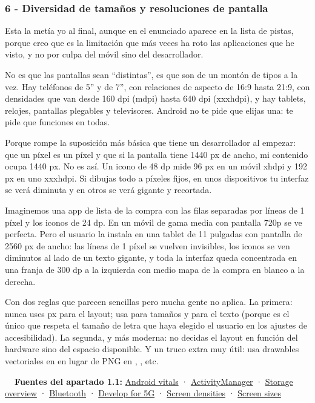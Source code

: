\subsubsection*{6 - Diversidad de tamaños y resoluciones de pantalla}

Esta la metía yo al final, aunque en el enunciado aparece en la lista de pistas, porque creo que es la limitación que más veces ha roto las aplicaciones que he visto, y no por culpa del móvil sino del desarrollador.

No es que las pantallas sean \enquote{distintas}, es que son de un montón de tipos a la vez. Hay teléfonos de 5'' y de 7'', con relaciones de aspecto de 16:9 hasta 21:9, con densidades que van desde 160 dpi (mdpi) hasta 640 dpi (xxxhdpi), y hay tablets, relojes, pantallas plegables y televisores. Android no te pide que elijas una: te pide que funciones en todas.

Porque rompe la suposición más básica que tiene un desarrollador al empezar: que un píxel es un píxel y que si la pantalla tiene 1440 px de ancho, mi contenido ocupa 1440 px. No es así. Un icono de 48 dp mide 96 px en un móvil xhdpi y 192 px en uno xxxhdpi. Si dibujas todo a píxeles fijos, en unos dispositivos tu interfaz se verá diminuta y en otros se verá gigante y recortada.

Imaginemos una app de lista de la compra con las filas separadas por líneas de 1 píxel y los iconos de 24 dp. En un móvil de gama media con pantalla 720p se ve perfecta. Pero el usuario la instala en una tablet de 11 pulgadas con pantalla de 2560 px de ancho: las líneas de 1 píxel se vuelven invisibles, los iconos se ven diminutos al lado de un texto gigante, y toda la interfaz queda concentrada en una franja de 300 dp a la izquierda con medio mapa de la compra en blanco a la derecha.

Con dos reglas que parecen sencillas pero mucha gente no aplica. La primera: nunca uses px para el layout; usa  para tamaños y  para el texto (porque  es el único que respeta el tamaño de letra que haya elegido el usuario en los ajustes de accesibilidad). La segunda, y más moderna: no decidas el layout en función del hardware sino del espacio disponible. Y un truco extra muy útil: usa drawables vectoriales en  en lugar de PNG en , , etc.

\begin{fuentesbox}
\textbf{\color{muted}\faBook\ \ Fuentes del apartado 1.1:}
\href{https://developer.android.com/topic/performance/vitals}{Android vitals} ·
\href{https://developer.android.com/reference/android/app/ActivityManager}{ActivityManager} ·
\href{https://developer.android.com/training/data-storage}{Storage overview} ·
\href{https://developer.android.com/develop/connectivity/bluetooth}{Bluetooth} ·
\href{https://developer.android.com/develop/connectivity/5g}{Develop for 5G} ·
\href{https://developer.android.com/training/multiscreen/screendensities}{Screen densities} ·
\href{https://developer.android.com/training/multiscreen/screensizes}{Screen sizes}
\end{fuentesbox}
